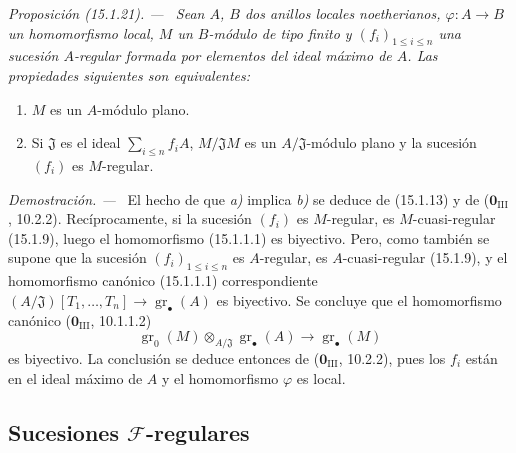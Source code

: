 \documentclass[10pt,oneside]{book}
\makeatletter
\newcommand{\gr}{\operatorname{gr}}
\newcommand{\setmanualcurrentlabel}[1]{\def\@currentlabel{#1}}
\newenvironment{proposition}[1][]{%
  \setmanualcurrentlabel{#1}\par\medskip\noindent\itshape Proposición (#1). ---\ }{\par}
\newenvironment{proof}{%
  \par\medskip\noindent\textit{Demostración. ---\ }}{\par}
\makeatother
\begin{document}
\begin{proposition}[15.1.21]
\label{0.15.1.21-es}
Sean $A$, $B$ dos anillos locales noetherianos, $\varphi:A\to B$ un
homomorfismo local, $M$ un $B$-módulo de tipo finito y
$(f_i)_{1\leq i\leq n}$ una sucesión $A$-regular formada por elementos del
ideal máximo de $A$. Las propiedades siguientes son equivalentes:
\begin{enumerate}
  \item[\textup{a)}] $M$ es un $A$-módulo plano.
  \item[\textup{b)}] Si $\mathfrak{J}$ es el ideal $\sum_{i\leq n}f_iA$,
  $M/\mathfrak{J}M$ es un $A/\mathfrak{J}$-módulo plano y la sucesión $(f_i)$
  es $M$-regular.
\end{enumerate}
\end{proposition}

\begin{proof}
El hecho de que \emph{a)} implica \emph{b)} se deduce de (15.1.13) y de
($\mathbf{0}_{\mathrm{III}}$, 10.2.2). Recíprocamente, si la sucesión $(f_i)$ es
$M$-regular, es $M$-cuasi-regular (15.1.9), luego el homomorfismo
(15.1.1.1) es biyectivo. Pero, como también se supone que la sucesión
$(f_i)_{1\leq i\leq n}$ es $A$-regular, es $A$-cuasi-regular (15.1.9), y el
homomorfismo canónico (15.1.1.1) correspondiente
$(A/\mathfrak{J})[T_1,\ldots,T_n]\to\gr_\bullet(A)$ es biyectivo. Se concluye
que el homomorfismo canónico ($\mathbf{0}_{\mathrm{III}}$, 10.1.1.2)
\[
  \gr_0(M)\otimes_{A/\mathfrak{J}}\gr_\bullet(A)
  \longrightarrow\gr_\bullet(M)
\]
es biyectivo. La conclusión se deduce entonces de ($\mathbf 0_{\mathrm{III}}$,
10.2.2), pues los $f_i$ están en el ideal máximo de $A$ y el homomorfismo
$\varphi$ es local.
\end{proof}

\subsection{Sucesiones \texorpdfstring{$\mathscr{F}$}{F}-regulares}
\label{subsection:0.15.2-es}
\end{document}
